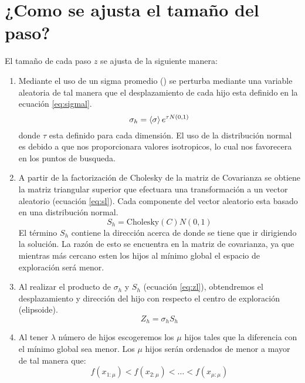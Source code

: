\section{¿Como se ajusta el tamaño del paso?}
El tamaño de cada paso $z$ se ajusta de la siguiente manera:
\begin{enumerate}
    \item Mediante el uso de un sigma promedio (\prom{\sigma}) se perturba mediante una variable aleatoria de tal manera que el desplazamiento de cada hijo esta definido en la ecuación \ref{eq:sigmal}.
          \begin{equation}
              \sigma_h = \left\langle \sigma \right\rangle e^{\tau N(0,1)}
              \label{eq:sigmal}
          \end{equation}
          donde $\tau$ esta definido para cada dimensión. El uso de la distribución normal es debido a que nos proporcionara valores isotropicos, lo cual nos favorecera en los puntos de busqueda.\cite{conference_hansen_2013_page_18}
    \item A partir de la factorización de Cholesky de la matriz de Covarianza se obtiene la matriz triangular superior que efectuara una transformación a un vector aleatorio (ecuación \ref{eq:sl}). Cada componente del vector aleatorio esta basado en una distribución normal.
          \begin{equation}
              S_h = \text{Cholesky}(C)N(0,1)
              \label{eq:sl}
          \end{equation}
          El término $S_h$ contiene la dirección acerca de donde se tiene que ir dirigiendo la solución. La razón de esto se encuentra en la matriz de covarianza, ya que mientras más cercano esten los hijos al mínimo global el espacio de exploración será menor.
    \item  Al realizar el producto de $\sigma_h$ y $S_h$ (ecuación \ref{eq:zl}), obtendremos el desplazamiento y dirección del hijo con respecto el centro de exploración (elipsoide).
          \begin{equation}
              Z_h = \sigma_h S_h
              \label{eq:zl}
          \end{equation}
    \item Al tener $\lambda$ número de hijos escogeremos los $\mu$ hijos tales que la diferencia con el mínimo global sea menor. Los $\mu$ hijos serán ordenados de menor a mayor de tal manera que:
          \begin{equation*}
              f(x_{1:\mu})<f(x_{2:\mu})<\dots < f(x_{\mu:\mu})
          \end{equation*}

\end{enumerate}
